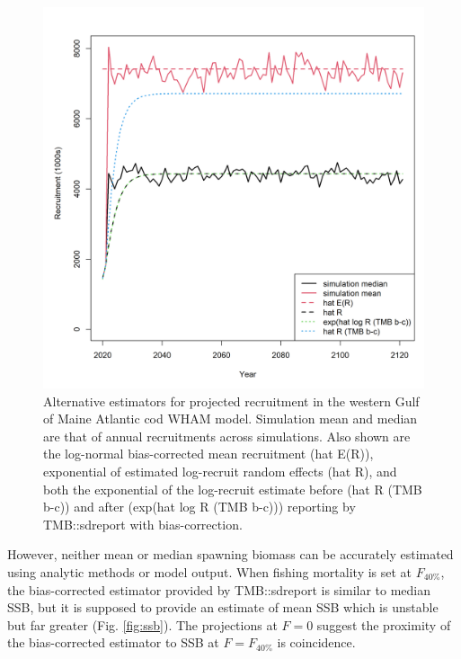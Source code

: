 \documentclass[
]{article}
\begin{document}
\begin{figure}

{\centering \includegraphics[width=1\linewidth]{compare_recruitment} 

}

\caption{Alternative estimators for projected recruitment in the western Gulf of Maine Atlantic cod WHAM model. Simulation mean and median are that of annual recruitments across simulations. Also shown are the log-normal bias-corrected mean recruitment (hat E(R)), exponential of estimated log-recruit random effects (hat R), and both the exponential of the log-recruit estimate before (hat R (TMB b-c)) and after (exp(hat log R (TMB b-c))) reporting by TMB::sdreport with bias-correction.}\label{fig:recruitment}
\end{figure}

However, neither mean or median spawning biomass can be accurately estimated using analytic methods or model output. When fishing mortality is set at \(F_{40\%}\), the bias-corrected estimator provided by TMB::sdreport is similar to median SSB, but it is supposed to provide an estimate of mean SSB which is unstable but far greater (Fig. \ref{fig:ssb}). The projections at \(F = 0\) suggest the proximity of the bias-corrected estimator to SSB at \(F=F_{40\%}\) is coincidence.
\end{document}
